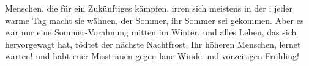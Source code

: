 Menschen, die für ein Zukünftiges kämpfen, irren sich meistens in der ; jeder warme Tag macht sie wähnen, der Sommer, ihr Sommer sei gekommen. Aber es war nur eine Sommer-Vorahnung mitten im Winter, und alles Leben, das sich hervorgewagt hat, tödtet der nächste Nachtfrost. Ihr höheren Menschen, lernet warten! und habt euer Misstrauen gegen laue Winde und vorzeitigen Frühling!
\par

